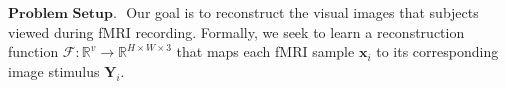 

$\textbf{Problem Setup. }$ Our goal is to reconstruct the visual images that subjects viewed during fMRI recording. Formally, we seek to learn a reconstruction function $\mathcal{F}: \mathbb{R}^v \rightarrow \mathbb{R}^{H \times W \times 3}$ that maps each fMRI sample $\mathbf{x}_i$ to its corresponding image stimulus $\mathbf{Y}_i$.

